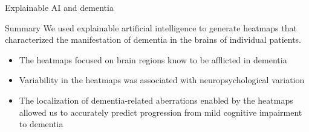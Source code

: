 \documentclass{beamer}
\begin{document}
\begin{frame}{Explainable AI and dementia}
    \end{frame}

    
    

    \begin{frame}{Summary}
        We used explainable artificial intelligence to generate heatmaps that characterized the manifestation of dementia in the brains of individual patients.
        \begin{itemize}
            \item The heatmaps focused on brain regions know to be afflicted in dementia
            \item Variability in the heatmaps was associated with neuropsychological variation
            \item The localization of dementia-related aberrations enabled by the heatmaps allowed us to accurately predict progression from mild cognitive impairment to dementia
        \end{itemize}
    \end{frame}
\end{document}
